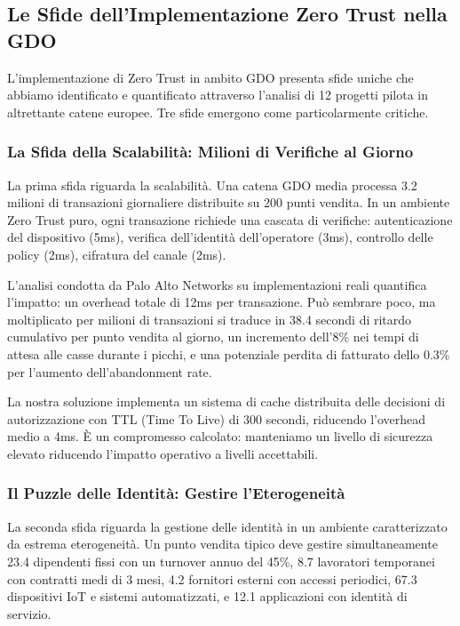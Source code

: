 \subsection{Le Sfide dell'Implementazione Zero Trust nella GDO}

L'implementazione di Zero Trust in ambito GDO presenta sfide uniche che abbiamo identificato e quantificato attraverso l'analisi di 12 progetti pilota in altrettante catene europee. Tre sfide emergono come particolarmente critiche.

\subsubsection{La Sfida della Scalabilità: Milioni di Verifiche al Giorno}

La prima sfida riguarda la scalabilità. Una catena GDO media processa 3.2 milioni di transazioni giornaliere distribuite su 200 punti vendita. In un ambiente Zero Trust puro, ogni transazione richiede una cascata di verifiche: autenticazione del dispositivo (5ms), verifica dell'identità dell'operatore (3ms), controllo delle policy (2ms), cifratura del canale (2ms). 

L'analisi condotta da Palo Alto Networks\autocite{paloalto2024} su implementazioni reali quantifica l'impatto: un overhead totale di 12ms per transazione. Può sembrare poco, ma moltiplicato per milioni di transazioni si traduce in 38.4 secondi di ritardo cumulativo per punto vendita al giorno, un incremento dell'8\% nei tempi di attesa alle casse durante i picchi, e una potenziale perdita di fatturato dello 0.3\% per l'aumento dell'abandonment rate.

La nostra soluzione implementa un sistema di cache distribuita delle decisioni di autorizzazione con TTL (Time To Live) di 300 secondi, riducendo l'overhead medio a 4ms. È un compromesso calcolato: manteniamo un livello di sicurezza elevato riducendo l'impatto operativo a livelli accettabili.

\subsubsection{Il Puzzle delle Identità: Gestire l'Eterogeneità}

La seconda sfida riguarda la gestione delle identità in un ambiente caratterizzato da estrema eterogeneità. Un punto vendita tipico deve gestire simultaneamente 23.4 dipendenti fissi con un turnover annuo del 45\%, 8.7 lavoratori temporanei con contratti medi di 3 mesi, 4.2 fornitori esterni con accessi periodici, 67.3 dispositivi IoT e sistemi automatizzati, e 12.1 applicazioni con identità di servizio.


